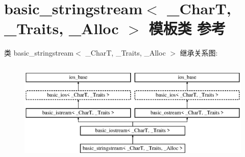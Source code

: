 \hypertarget{classbasic__stringstream}{}\section{basic\+\_\+stringstream$<$ \+\_\+\+CharT, \+\_\+\+Traits, \+\_\+\+Alloc $>$ 模板类 参考}
\label{classbasic__stringstream}
类 basic\+\_\+stringstream$<$ \+\_\+\+CharT, \+\_\+\+Traits, \+\_\+\+Alloc $>$ 继承关系图\+:\begin{figure}[H]
\begin{center}
\leavevmode
\includegraphics[height=4.946997cm]{classbasic__stringstream}
\end{center}
\end{figure}
